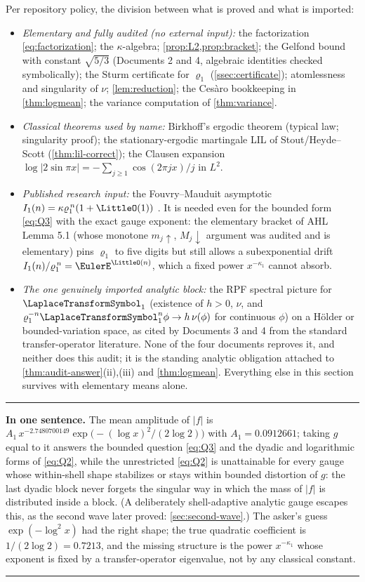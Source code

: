 \documentclass[11pt,oneside]{article}
\theoremstyle{definition}
\theoremstyle{remark}
\newenvironment{boxedremark}{%
  \par\smallskip\noindent\begin{center}\begin{minipage}{0.94\textwidth}%
  \color{black}\hrule\vspace{0.6em}\small
}{%
  \vspace{0.6em}\hrule\end{minipage}\end{center}\smallskip
}
\begin{document}
Per repository policy, the division between what is proved and what is
imported:
\begin{itemize}
\item \emph{Elementary and fully audited (no external input):}
the factorization \eqref{eq:factorization}; the $\kappa$-algebra;
\cref{prop:L2,prop:bracket}; the Gelfond bound with constant
$\sqrt{5/3}$ (Documents 2 and 4, algebraic identities checked
symbolically); the Sturm certificate for $\varrho_1$
(\cref{ssec:certificate}); atomlessness and singularity of $\nu$;
\cref{lem:reduction}; the Ces\`aro bookkeeping in
\cref{thm:logmean}; the variance computation of \cref{thm:variance}.
\item \emph{Classical theorems used by name:}
Birkhoff's ergodic theorem (typical law; singularity proof); the
stationary-ergodic martingale LIL of Stout/Heyde--Scott
(\cref{thm:lil-correct}); the Clausen expansion
$\log|2\sin\pi x|=-\sum_{j\ge1}\cos(2\pi jx)/j$ in $L^2$.
\item \emph{Published research input:}
the Fouvry--Mauduit asymptotic
$I_1(n)=\kappa\varrho_1^{\,n}(1+\LittleO(1))$
\cite{fouvrymauduit1996}.  It is needed even for the bounded form
\eqref{eq:Q3} with the exact gauge exponent: the elementary bracket of
AHL Lemma 5.1 (whose monotone $m_j\uparrow$, $M_j\downarrow$ argument was
audited and is elementary) pins $\varrho_1$ to five digits but still
allows a subexponential drift $I_1(n)/\varrho_1^{\,n}=\EulerE^{\LittleO(n)}$,
which a fixed power $x^{-\kappa_1}$ cannot absorb.
\item \emph{The one genuinely imported analytic block:}
the RPF spectral picture for $\LaplaceTransformSymbol_1$ (existence of $h>0$, $\nu$, and
$\varrho_1^{-n}\LaplaceTransformSymbol_1^n\phi\to h\,\nu(\phi)$ for continuous $\phi$) on a
H\"older or bounded-variation space, as cited by Documents 3 and 4 from
the standard transfer-operator literature.  None of the four documents
reproves it, and neither does this audit; it is the standing analytic
obligation attached to \cref{thm:audit-answer}(ii),(iii) and
\cref{thm:logmean}.  Everything else in this section survives with
elementary means alone.
\end{itemize}

\begin{boxedremark}
\textbf{In one sentence.}  The mean amplitude of $|f|$ is
$A_1\,x^{-2.7480700149}\exp\bigl(-(\log x)^2/(2\log2)\bigr)$ with
$A_1=0.0912661$; taking $g$ equal to it answers the bounded question
\eqref{eq:Q3} and the dyadic and logarithmic forms of \eqref{eq:Q2},
while the unrestricted \eqref{eq:Q2} is unattainable for every gauge
whose within-shell shape stabilizes or stays within bounded distortion
of $g$: the last dyadic block never forgets the singular way in which
the mass of $|f|$ is distributed inside a block.  (A deliberately
shell-adaptive analytic gauge escapes this, as the second wave later
proved: \cref{sec:second-wave}.)  The asker's guess
$\exp(-\log^2x)$ had the right shape; the true quadratic coefficient is
$1/(2\log2)=0.7213$, and the missing structure is the power
$x^{-\kappa_1}$ whose exponent is fixed by a transfer-operator
eigenvalue, not by any classical constant.
\end{boxedremark}
\end{document}
